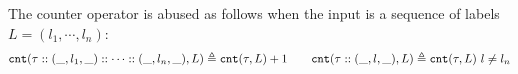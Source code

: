 The counter operator is abused as follows when the input is a sequence of labels $L = (l_1, \cdots, l_n)$:
\[
  \mathtt{cnt}(\mathtt{\tau} :: (\_, l_1, \_) :: \cdots :: (\_, l_n, \_), L ) 
  \triangleq \mathtt{cnt}(\mathtt{\tau}, L) + 1
  \qquad 
  \mathtt{cnt}(\mathtt{\tau} :: (\_, l, \_), L ) 
  \triangleq \mathtt{cnt}(\mathtt{\tau}, L) ~ l \neq l_n
  \]
%
%
